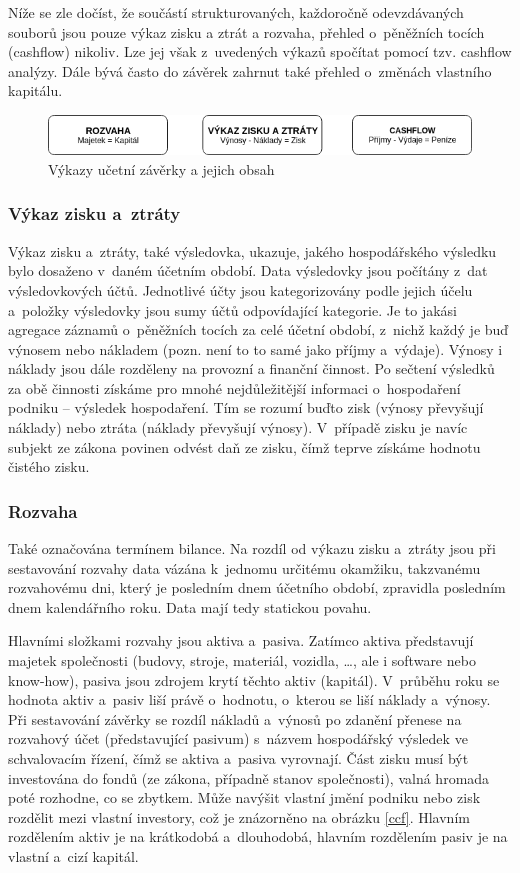 Níže se zle dočíst, že součástí strukturovaných, každoročně odevzdávaných souborů jsou pouze výkaz zisku a ztrát a rozvaha, přehled o~pěněžních tocích (cashflow) nikoliv. Lze jej však z~uvedených výkazů spočítat pomocí tzv. cashflow analýzy. Dále bývá často do závěrek zahrnut také přehled o~změnách vlastního kapitálu.


\begin{figure}
  \centering
  \includegraphics[width=14cm]{img/vykazy.png}
  \caption{Výkazy učetní závěrky a jejich obsah \cite{komplex}}
\end{figure}

\subsubsection{Výkaz zisku a~ztráty}
Výkaz zisku a~ztráty, také výsledovka, ukazuje, jakého hospodářského výsledku bylo dosaženo v~daném účetním období. Data výsledovky jsou počítány z~dat výsledovkových účtů. Jednotlivé účty jsou kategorizovány podle jejich účelu a~položky výsledovky jsou sumy účtů odpovídající kategorie. Je to jakási agregace záznamů o~pěněžních tocích za celé účetní období, z~nichž každý je buď výnosem nebo nákladem (pozn. není to to samé jako příjmy a~výdaje). Výnosy i náklady jsou dále rozděleny na provozní a finanční činnost. Po sečtení výsledků za obě činnosti získáme pro mnohé nejdůležitější informaci o~hospodaření podniku -- výsledek hospodaření. Tím se rozumí buďto zisk (výnosy převyšují náklady) nebo ztráta (náklady převyšují výnosy). V~případě zisku je navíc subjekt ze zákona povinen odvést daň ze zisku, čímž teprve získáme hodnotu čistého zisku.

\subsubsection{Rozvaha}
Také označována termínem bilance. Na rozdíl od výkazu zisku a~ztráty jsou při sestavování rozvahy data vázána k~jednomu určitému okamžiku, takzvanému rozvahovému dni, který je posledním dnem účetního období, zpravidla posledním dnem kalendářního roku. Data mají tedy statickou povahu.

Hlavními složkami rozvahy jsou aktiva a~pasiva. Zatímco aktiva představují majetek společnosti (budovy, stroje, materiál, vozidla, \dots, ale i software nebo know-how), pasiva jsou zdrojem krytí těchto aktiv (kapitál). V~průběhu roku se hodnota aktiv a~pasiv liší právě o~hodnotu, o~kterou se liší náklady a~výnosy. Při sestavování závěrky se rozdíl nákladů a~výnosů po zdanění přenese na rozvahový účet (představující pasivum) s~názvem hospodářský výsledek ve schvalovacím řízení, čímž se aktiva a~pasiva vyrovnají. Část zisku musí být investována do fondů (ze zákona, případně stanov společnosti), valná hromada poté rozhodne, co se zbytkem. Může navýšit vlastní jmění podniku nebo zisk rozdělit mezi vlastní investory, což je znázorněno na obrázku \ref{ccf}. Hlavním rozdělením aktiv je na krátkodobá a~dlouhodobá, hlavním rozdělením pasiv je na vlastní a~cizí kapitál.




